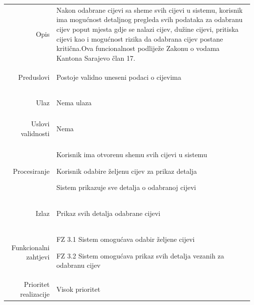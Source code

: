 \documentclass[]{report}
\begin{document}
\begin{tabular}{rp{}}
Opis & Nakon odabrane cijevi sa sheme svih cijevi u sistemu, korisnik ima mogućnost detaljnog pregleda svih podataka za odabranu cijev poput mjesta gdje se nalazi cijev, dužine cijevi, pritiska cijevi kao i mogućnost rizika da odabrana cijev postane kritična.Ova funcionalnost podliježe Zakonu o vodama Kantona Sarajevo član 17.

\\
Preduslovi & 
\begin{compactitem}
    \item Postoje validno uneseni podaci o cijevima
\end{compactitem}

\\
Ulaz & 

\begin{compactitem} 
    \item Nema ulaza
\end{compactitem}

\\
Uslovi validnosti &

\begin{compactitem} 
    \item Nema
\end{compactitem}

\\
Procesiranje &

\begin{compactitem} 
    \item Korisnik ima otvorenu shemu svih cijevi u sistemu
    \item Korisnik odabire željenu cijev za prikaz detalja
    \item Sistem prikazuje sve detalja o odabranoj cijevi
\end{compactitem}

\\
Izlaz &

\begin{compactitem} 
    \item Prikaz svih detalja odabrane cijevi
\end{compactitem}

\\
Funkcionalni zahtjevi &

\begin{compactitem} 
    \item FZ 3.1 Sistem omogućava odabir željene cijevi
    \item FZ 3.2 Sistem omogućava prikaz svih detalja vezanih za odabranu cijev
\end{compactitem}

\\
Prioritet realizacije &
\hspace{12pt} Visok prioritet
\\
\end{tabular}
\end{document}
